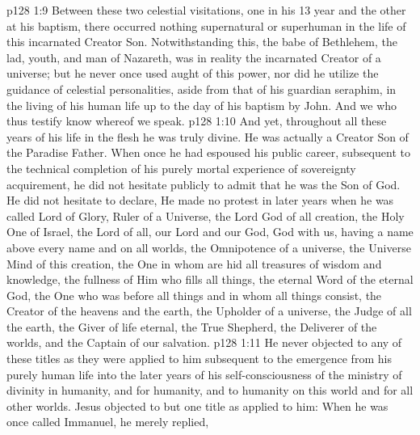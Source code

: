 \vs p128 1:9 Between these two celestial visitations, one in his 13 year and the other at his baptism, there occurred nothing supernatural or superhuman in the life of this incarnated Creator Son. Notwithstanding this, the babe of Bethlehem, the lad, youth, and man of Nazareth, was in reality the incarnated Creator of a universe; but he never once used aught of this power, nor did he utilize the guidance of celestial personalities, aside from that of his guardian seraphim, in the living of his human life up to the day of his baptism by John. And we who thus testify know whereof we speak.
\vs p128 1:10 And yet, throughout all these years of his life in the flesh he was truly divine. He was actually a Creator Son of the Paradise Father. When once he had espoused his public career, subsequent to the technical completion of his purely mortal experience of sovereignty acquirement, he did not hesitate publicly to admit that he was the Son of God. He did not hesitate to declare,  He made no protest in later years when he was called Lord of Glory, Ruler of a Universe, the Lord God of all creation, the Holy One of Israel, the Lord of all, our Lord and our God, God with us, having a name above every name and on all worlds, the Omnipotence of a universe, the Universe Mind of this creation, the One in whom are hid all treasures of wisdom and knowledge, the fullness of Him who fills all things, the eternal Word of the eternal God, the One who was before all things and in whom all things consist, the Creator of the heavens and the earth, the Upholder of a universe, the Judge of all the earth, the Giver of life eternal, the True Shepherd, the Deliverer of the worlds, and the Captain of our salvation.
\vs p128 1:11 \pc He never objected to any of these titles as they were applied to him subsequent to the emergence from his purely human life into the later years of his self\hyp{}consciousness of the ministry of divinity in humanity, and for humanity, and to humanity on this world and for all other worlds. Jesus objected to but one title as applied to him: When he was once called Immanuel, he merely replied, 
